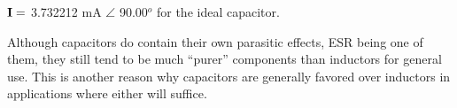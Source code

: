 \vskip 10pt

${\bf I} =$ 3.732212 mA $\angle$ 90.00$^{o}$ for the ideal capacitor.







Although capacitors do contain their own parasitic effects, ESR being one of them, they still tend to be much ``purer'' components than inductors for general use.  This is another reason why capacitors are generally favored over inductors in applications where either will suffice.




